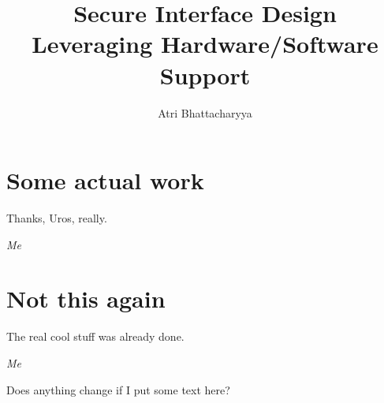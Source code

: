 \documentclass[lablogo]{thesis}
\title{Secure Interface Design \\Leveraging Hardware/Software Support}
\author{Atri Bhattacharyya}
\begin{document}



\chapter{Some actual work}
\label{ch:midas}
\epigraph{Thanks, Uros, really.}%
        {\textit{Me}}




\chapter{Not this again}
\label{ch:seccells}
\epigraph{The real cool stuff was already done.}%
        {\textit{Me}}

Does anything change if I put some text here?


% 


\backmatter


{}

\end{document}
